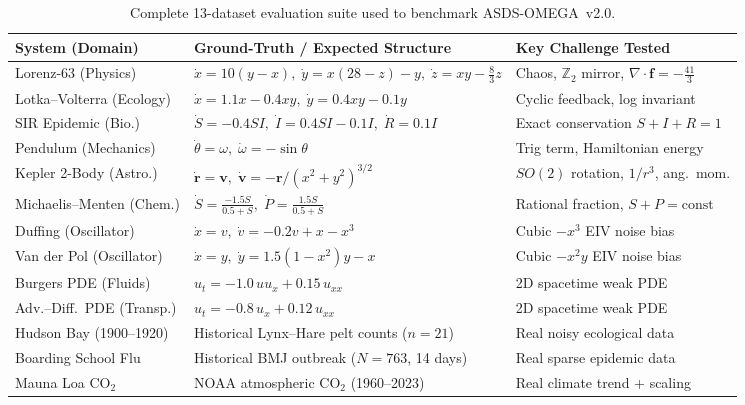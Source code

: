 \documentclass[11pt,a4paper]{article}
\begin{document}
\begin{table}[!htbp]
\centering
\caption{Complete 13-dataset evaluation suite used to benchmark ASDS-OMEGA~v2.0.}
\label{tab:benchmarks_list}
\small
\begin{tabular}{@{}>{\raggedright\arraybackslash}p{} >{\raggedright\arraybackslash}p{} >{\raggedright\arraybackslash}p{}@{}}
\toprule
\textbf{System (Domain)} & \textbf{Ground-Truth / Expected Structure} & \textbf{Key Challenge Tested} \\
\midrule
Lorenz-63 (Physics) & $\dot{x}=10(y-x),\; \dot{y}=x(28-z)-y,\; \dot{z}=xy-\frac{8}{3}z$ & Chaos, $\mathbb{Z}_2$ mirror, $\nabla\cdot\mathbf{f}=-\frac{41}{3}$ \\
Lotka--Volterra (Ecology) & $\dot{x}=1.1x-0.4xy,\; \dot{y}=0.4xy-0.1y$ & Cyclic feedback, log invariant \\
SIR Epidemic (Bio.) & $\dot{S}=-0.4SI,\; \dot{I}=0.4SI-0.1I,\; \dot{R}=0.1I$ & Exact conservation $S+I+R=1$ \\
Pendulum (Mechanics) & $\dot{\theta}=\omega,\; \dot{\omega}=-\sin\theta$ & Trig term, Hamiltonian energy \\
Kepler 2-Body (Astro.) & $\dot{\mathbf{r}}=\mathbf{v},\; \dot{\mathbf{v}}=-\mathbf{r}/(x^2+y^2)^{3/2}$ & $SO(2)$ rotation, $1/r^3$, ang.\ mom. \\
Michaelis--Menten (Chem.) & $\dot{S}=\frac{-1.5S}{0.5+S},\; \dot{P}=\frac{1.5S}{0.5+S}$ & Rational fraction, $S+P=\text{const}$ \\
Duffing (Oscillator) & $\dot{x}=v,\; \dot{v}=-0.2v+x-x^3$ & Cubic $-x^3$ EIV noise bias \\
Van der Pol (Oscillator) & $\dot{x}=y,\; \dot{y}=1.5(1-x^2)y-x$ & Cubic $-x^2y$ EIV noise bias \\
\midrule
Burgers PDE (Fluids) & $u_t = -1.0\,u u_x + 0.15\,u_{xx}$ & 2D spacetime weak PDE \\
Adv.--Diff.\ PDE (Transp.) & $u_t = -0.8\,u_x + 0.12\,u_{xx}$ & 2D spacetime weak PDE \\
\midrule
Hudson Bay (1900--1920) & Historical Lynx--Hare pelt counts ($n=21$) & Real noisy ecological data \\
1978 Boarding School Flu & Historical BMJ outbreak ($N=763$, 14 days) & Real sparse epidemic data \\
Mauna Loa $\text{CO}_2$ & NOAA atmospheric $\text{CO}_2$ (1960--2023) & Real climate trend + scaling \\
\bottomrule
\end{tabular}
\end{table}
\end{document}

